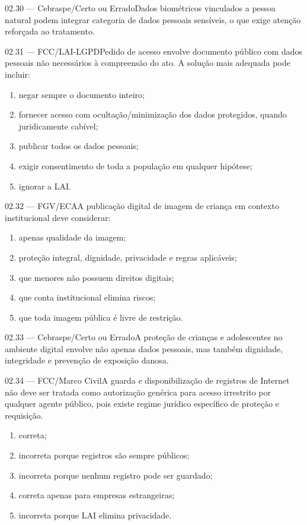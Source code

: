\begin{questao}{ 02.30 — Cebraspe/Certo ou Errado}Dados biométricos vinculados a pessoa natural podem integrar categoria de dados pessoais sensíveis, o que exige atenção reforçada ao tratamento.\end{questao}
\begin{questao}{ 02.31 — FCC/LAI-LGPD}Pedido de acesso envolve documento público com dados pessoais não necessários à compreensão do ato. A solução mais adequada pode incluir:\begin{enumerate}[label=\Alph*)]\item negar sempre o documento inteiro;\item fornecer acesso com ocultação/minimização dos dados protegidos, quando juridicamente cabível;\item publicar todos os dados pessoais;\item exigir consentimento de toda a população em qualquer hipótese;\item ignorar a LAI.\end{enumerate}\end{questao}
\begin{questao}{ 02.32 — FGV/ECA}A publicação digital de imagem de criança em contexto institucional deve considerar:\begin{enumerate}[label=\Alph*)]\item apenas qualidade da imagem;\item proteção integral, dignidade, privacidade e regras aplicáveis;\item que menores não possuem direitos digitais;\item que conta institucional elimina riscos;\item que toda imagem pública é livre de restrição.\end{enumerate}\end{questao}
\begin{questao}{ 02.33 — Cebraspe/Certo ou Errado}A proteção de crianças e adolescentes no ambiente digital envolve não apenas dados pessoais, mas também dignidade, integridade e prevenção de exposição danosa.\end{questao}
\begin{questao}{ 02.34 — FCC/Marco Civil}A guarda e disponibilização de registros de Internet não deve ser tratada como autorização genérica para acesso irrestrito por qualquer agente público, pois existe regime jurídico específico de proteção e requisição.\begin{enumerate}[label=\Alph*)]\item correta;\item incorreta porque registros são sempre públicos;\item incorreta porque nenhum registro pode ser guardado;\item correta apenas para empresas estrangeiras;\item incorreta porque LAI elimina privacidade.\end{enumerate}\end{questao}
